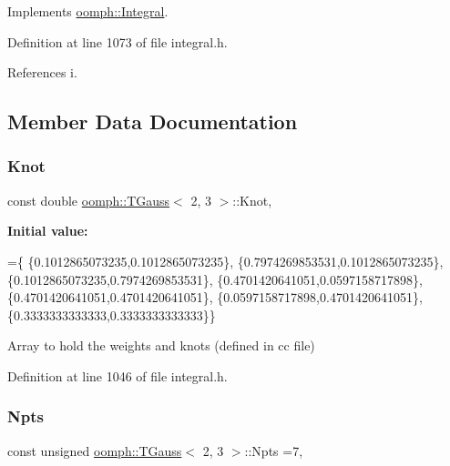 Implements \hyperlink{classoomph_1_1Integral_ac65335e2aab120b285b3d6c294507b06}{oomph\+::\+Integral}.



Definition at line 1073 of file integral.\+h.



References i.



\subsection{Member Data Documentation}
\mbox{\label{classoomph_1_1TGauss_3_012_00_013_01_4_acb6d60be9546576219e42596be211842}} 
\subsubsection{\texorpdfstring{Knot}{Knot}}
{\footnotesize\ttfamily const double \hyperlink{classoomph_1_1TGauss}{oomph\+::\+T\+Gauss}$<$ 2, 3 $>$\+::Knot\hspace{0.3cm}{\ttfamily [static]}, {\ttfamily [private]}}

{\bfseries Initial value\+:}
\begin{DoxyCode}
=\{
 \{0.1012865073235,0.1012865073235\},
 \{0.7974269853531,0.1012865073235\},
 \{0.1012865073235,0.7974269853531\},
 \{0.4701420641051,0.0597158717898\},
 \{0.4701420641051,0.4701420641051\},
 \{0.0597158717898,0.4701420641051\},
 \{0.3333333333333,0.3333333333333\}\}
\end{DoxyCode}


Array to hold the weights and knots (defined in cc file) 



Definition at line 1046 of file integral.\+h.

\mbox{\label{classoomph_1_1TGauss_3_012_00_013_01_4_a056ee4c02fcdd17b4de1740bfa1b3473}} 
\subsubsection{\texorpdfstring{Npts}{Npts}}
{\footnotesize\ttfamily const unsigned \hyperlink{classoomph_1_1TGauss}{oomph\+::\+T\+Gauss}$<$ 2, 3 $>$\+::Npts =7\hspace{0.3cm}{\ttfamily [static]}, {\ttfamily [private]}}



